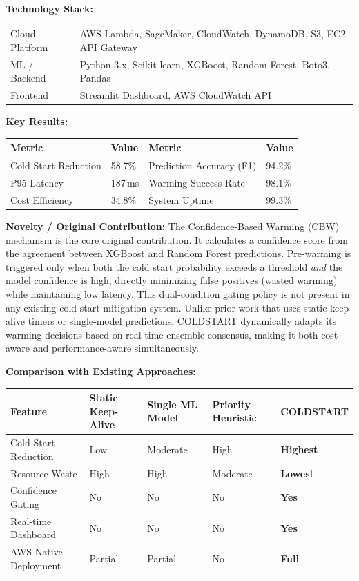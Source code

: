 \documentclass[10pt,a4paper]{article}
\begin{document}
\smallskip
\noindent\textbf{Technology Stack:}

\noindent
\begin{tabular}{@{} p{3cm} p{12.5cm} @{}}
Cloud Platform & AWS Lambda, SageMaker, CloudWatch, DynamoDB, S3, EC2, API Gateway \\
ML / Backend   & Python 3.x, Scikit-learn, XGBoost, Random Forest, Boto3, Pandas \\
Frontend       & Streamlit Dashboard, AWS CloudWatch API \\
\end{tabular}

\smallskip
\noindent\textbf{Key Results:}

\noindent
\begin{tabular}{@{} p{5cm} p{2.2cm} p{5cm} p{2.2cm} @{}}
\toprule
\textbf{Metric} & \textbf{Value} & \textbf{Metric} & \textbf{Value} \\
\midrule
Cold Start Reduction   & 58.7\%  & Prediction Accuracy (F1) & 94.2\% \\
P95 Latency            & 187\,ms & Warming Success Rate      & 98.1\% \\
Cost Efficiency        & 34.8\%  & System Uptime             & 99.3\% \\
\bottomrule
\end{tabular}

\smallskip
\noindent\textbf{Novelty / Original Contribution:}
The Confidence-Based Warming (CBW) mechanism is the core original contribution. It calculates a confidence score from the agreement between XGBoost and Random Forest predictions. Pre-warming is triggered only when both the cold start probability exceeds a threshold \textit{and} the model confidence is high, directly minimizing false positives (wasted warming) while maintaining low latency. This dual-condition gating policy is not present in any existing cold start mitigation system. Unlike prior work that uses static keep-alive timers or single-model predictions, COLDSTART dynamically adapts its warming decisions based on real-time ensemble consensus, making it both cost-aware and performance-aware simultaneously.

\smallskip
\noindent\textbf{Comparison with Existing Approaches:}

\noindent
\begin{tabular}{@{} p{4.2cm} p{2.8cm} p{2.8cm} p{2.8cm} p{2.8cm} @{}}
\toprule
\textbf{Feature} & \textbf{Static Keep-Alive} & \textbf{Single ML Model} & \textbf{Priority Heuristic} & \textbf{COLDSTART} \\
\midrule
Cold Start Reduction  & Low     & Moderate & High     & \textbf{Highest} \\
Resource Waste        & High    & High     & Moderate & \textbf{Lowest}  \\
Confidence Gating     & No      & No       & No       & \textbf{Yes}     \\
Real-time Dashboard   & No      & No       & No       & \textbf{Yes}     \\
AWS Native Deployment & Partial & Partial  & No       & \textbf{Full}    \\
\bottomrule
\end{tabular}
\end{document}
